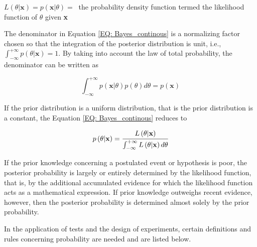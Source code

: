 \documentclass[a4paper,fleqn]{cas-dc}
\begin{document}
$L\left( \theta|\textbf{x} \right) = p\left( \textbf{x}|\theta \right) = ~$ the probability density function termed the likelihood function of $\theta$ given \textbf{x}

The denominator in Equation \ref{EQ: Bayes_continous} is a normalizing factor chosen so that the integration of the posterior distribution is unit, i.e., $\int_{-\infty}^{+\infty} p\left( \theta|\textbf{x} \right) = 1$. By taking into account the law of total probability, the denominator can be written as

{\footnotesize
\begin{equation}
	\int_{-\infty}^{+\infty} p\left( \textbf{x}|\theta \right) p(\theta) d\theta = p(\textbf{x})
\end{equation} }

If the prior distribution is a uniform distribution, that is the prior distribution is a constant, the Equation \ref{EQ: Bayes_continous} reduces to 

{\footnotesize
\begin{equation}
	p\left( \theta|\textbf{x} \right) = \cfrac{L\left( \theta|\textbf{x} \right)}{\int_{-\infty}^{+\infty} L\left( \theta|\textbf{x}\right) d\theta}
\end{equation} }

If the prior knowledge concerning a postulated event or hypothesis is poor, the posterior probability is largely or entirely determined by the likelihood function, that is, by the additional accumulated evidence for which the likelihood function acts as a mathematical expression. If prior knowledge outweighs recent evidence, however, then the posterior probability is determined almost solely by the prior probability.

In the application of tests and the design of experiments, certain definitions and rules concerning probability are needed and are listed below.
\end{document}
